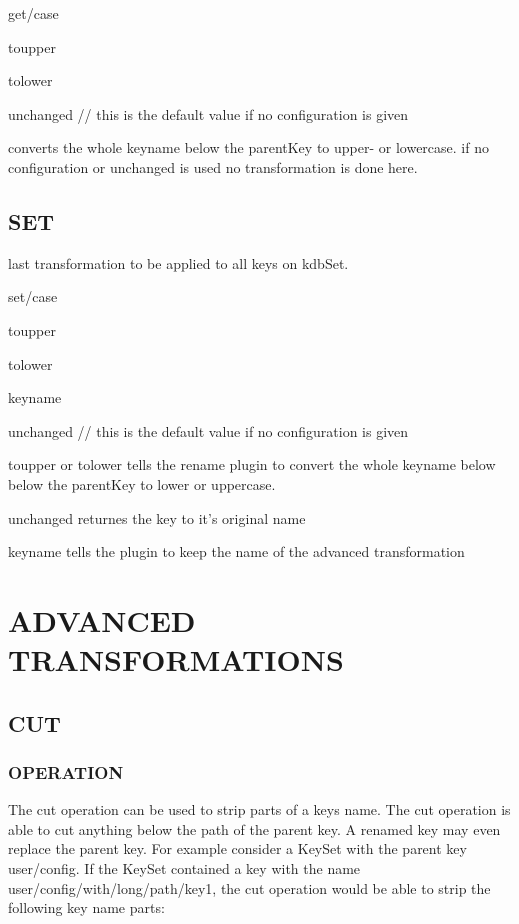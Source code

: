 {\ttfamily get/case}
\begin{DoxyItemize}
\item toupper
\item tolower
\item unchanged // this is the default value if no configuration is given
\end{DoxyItemize}

converts the whole keyname below the parent\+Key to upper-\/ or lowercase. if no configuration or {\ttfamily unchanged} is used no transformation is done here.

\subsection*{S\+E\+T}

last transformation to be applied to all keys on kdb\+Set.

{\ttfamily set/case}
\begin{DoxyItemize}
\item toupper
\item tolower
\item keyname
\item unchanged // this is the default value if no configuration is given
\end{DoxyItemize}

{\ttfamily toupper} or {\ttfamily tolower} tells the rename plugin to convert the whole keyname below below the parent\+Key to lower or uppercase.

{\ttfamily unchanged} returnes the key to it's original name

{\ttfamily keyname} tells the plugin to keep the name of the advanced transformation

\section*{A\+D\+V\+A\+N\+C\+E\+D T\+R\+A\+N\+S\+F\+O\+R\+M\+A\+T\+I\+O\+N\+S}

\subsection*{C\+U\+T}

\subsubsection*{O\+P\+E\+R\+A\+T\+I\+O\+N}

The cut operation can be used to strip parts of a keys name. The cut operation is able to cut anything below the path of the parent key. A renamed key may even replace the parent key. For example consider a Key\+Set with the parent key {\ttfamily user/config}. If the Key\+Set contained a key with the name {\ttfamily user/config/with/long/path/key1}, the cut operation would be able to strip the following key name parts\+:


